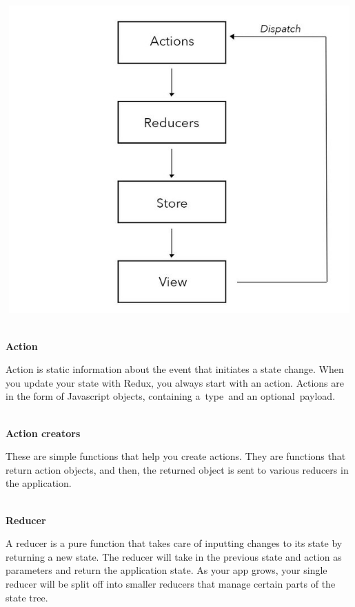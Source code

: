 \documentclass{article}
\begin{document}
\begin{center}
	\noindent \includegraphics*[width=6.25in, height=4.64in]{IMG-11-01}
\end{center}

\noindent 

\noindent 
\\
\textbf{Action}

\noindent 

\noindent Action is static information about the event that initiates a state change. When you update your state with Redux, you always start with an action. Actions are in the form of Javascript objects, containing a~type~and an optional~payload.

\noindent 
\\
\textbf{Action creators}

\noindent 

\noindent These are simple functions that help you create actions. They are functions that return action objects, and then, the returned object is sent to various reducers in the application.

\noindent 
\\
\textbf{Reducer}

\noindent A reducer is a pure function that takes care of inputting changes to its state by returning a new state. The reducer will take in the previous state and action as parameters and return the application state. As your app grows, your single reducer will be split off into smaller reducers that manage certain parts of the state tree.
\end{document}
